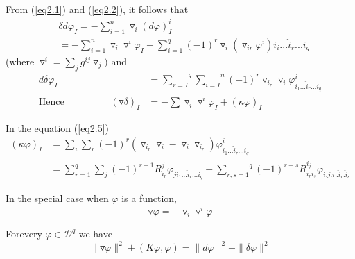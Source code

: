 \begin{theorem}
  From (\ref{eq2.1}) and (\ref{eq2.2}), it follows that
  \begin{align*}
      &\delta  d \varphi_I = -\sum^n_{i=1} \triangledown_i(d \varphi)^i_I \\
      &=- \sum^n_{i=1} \triangledown_i \triangledown^i
      \varphi_I-\sum^q_{i=1}(-1)^r
      \triangledown_i(\triangledown_{ir}\varphi^i)
      i_i...\hat{i}_r...i_q \tag{2.3}\label{eq2.3} 
  \end{align*}
  (where $\triangledown^i  =\sum_j g^{ij}\triangledown_j)$ \: and
  \begin{align*}
    d \delta \varphi_I & = \overset q {\underset {r=I} {\sum }}
    \overset n {\underset {i=I} {\sum}}(-1)^r \triangledown_{{i}_{r}}
    \triangledown_i \varphi^i _{i_1...\hat{i}_r...i_q} \tag{2.4}\label{eq2.4} \\ 
    \text{Hence} \hspace{2cm}(\triangledown \delta)_I & =-\sum \triangledown_i
    \triangledown^i \varphi_I +(\kappa \varphi)_I \hspace{2cm}
    \tag{2.5}\label{eq2.5} 
  \end{align*}

 In the equation (\ref{eq2.5})
\begin{align*} 
 (\kappa \varphi)_I & =\sum_i \sum_r (-1)^r
   (\triangledown_{{i}_{r}} \triangledown_i -\triangledown_i
   \triangledown_{{i}_{r}})\varphi^i_{i_1...\hat{i} _r...i_q}\\ 
   & =\sum^q_{r=1} \sum_j(-1)^{r-1}R^j_{{i}_{r}} \varphi_
       {ji_1...\hat{i}_r...i_q} + \overset{q} {\underset
       {r,s=1} {\sum}}(-1)^{r+s} R^{i_j}_{i_r i_s
       }\varphi_{i.j.i_..\hat{i}_r.\hat{i}_ s}
\end{align*}

 In the special case when $\varphi$ is a function,
 \begin{equation*}
   \triangledown \varphi = - \triangledown_i \triangledown^i \varphi
   \tag{2.6}\label{eq2.6}  
 \end{equation*}
\end{theorem}

\setcounter{lemma}{0}
\begin{lemma}\label{chap2:lem2.1}%
  For\pageoriginale every $\varphi \in \mathscr{D}^q$ we have
  \begin{equation*}
    \parallel \triangledown \varphi \parallel^2 + (K \varphi,\varphi)=
    \parallel d \varphi \parallel^2 + \parallel \delta \varphi
    \parallel^2  \tag{2.7}\label{eq2.7}  
  \end{equation*}
\end{lemma}

